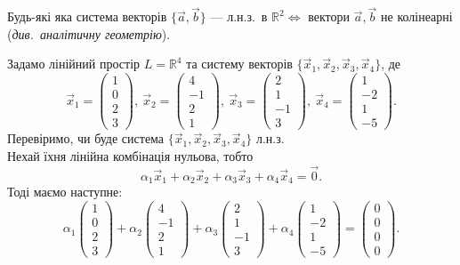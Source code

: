 \documentclass{math_library}
\begin{document}
	\begin{example}
	Будь-які яка система векторів $\{\vec{a}, \vec{b} \}$ --- л.н.з.\ в $\mathbb{R}^2 \iff $ вектори $\vec{a},\vec{b}$ не колінеарні (\textit{див.\ аналітичну геометрію}).
	\end{example}
	
	\begin{example}
	Задамо лінійний простір $L = \mathbb{R}^4$ та систему векторів $\{\vec{x}_1,\vec{x}_2,\vec{x}_3,\vec{x}_4\}$, де
	\[
	\vec{x}_1 =\begin{pmatrix} 1\\ 0\\ 2\\ 3 \end{pmatrix},\ \vec{x}_2 =\begin{pmatrix} 4\\ -1\\ 2\\ 1 \end{pmatrix},\ \vec{x}_3 =\begin{pmatrix} 2\\ 1\\ -1\\ 3 \end{pmatrix},\ \vec{x}_4 =\begin{pmatrix} 1\\ -2\\ 1\\ -5 \end{pmatrix}.
	\]
	Перевіримо, чи буде система $\{\vec{x}_1,\vec{x}_2,\vec{x}_3,\vec{x}_4\}$ л.н.з. 
	\bigskip \\
	Нехай їхня лінійна комбінація нульова, тобто
	\[
	\alpha_1 \vec{x}_1 + \alpha_2 \vec{x}_2 + \alpha_3 \vec{x}_3 + \alpha_4 \vec{x}_4 = \vec{0}.
	\]
	Тоді маємо наступне:
	\[
	\alpha_1 \begin{pmatrix} 1\\ 0\\ 2\\ 3 \end{pmatrix} + \alpha_2 \begin{pmatrix} 4\\ -1\\ 2\\ 1 \end{pmatrix} + \alpha_3 \begin{pmatrix} 2\\ 1\\ -1\\ 3 \end{pmatrix} + \alpha_4 \begin{pmatrix} 1\\ -2\\ 1\\ -5 \end{pmatrix} = \begin{pmatrix} 0\\ 0\\ 0\\ 0 \end{pmatrix}.
\]
\end{example}
\end{document}
